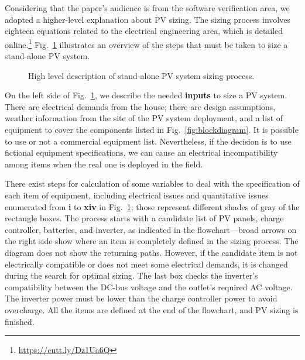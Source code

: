 \documentclass[a4paper,donotrepeattitle,fleqn]{cas-dc}
\begin{document}
Considering that the paper's audience is from the software verification area, we adopted a higher-level explanation about PV sizing. The sizing process involves eighteen equations related to the electrical engineering area, which is detailed online.\footnote{\href{https://cutt.ly/Dz1Ua6Q}{https://cutt.ly/Dz1Ua6Q}} 
Fig.~\ref{fig:flow} illustrates an overview of the steps that must be taken to size a stand-alone PV system.
%
\begin{figure}[ht]
\centering
\caption{High level description of stand-alone PV system sizing process.}
\label{fig:flow} 
\end{figure}
 

On the left side of Fig.~\ref{fig:flow}, we describe the needed \textbf{inputs} to size a PV system. There are electrical demands from the house; there are design assumptions, weather information from the site of the PV system deployment, and a list of equipment to cover the components listed in Fig.~\ref{fig:blockdiagram}. It is possible to use or not a commercial equipment list. Nevertheless, if the decision is to use fictional equipment specifications, we can cause an electrical incompatibility among items when the real one is deployed in the field.
 
There exist steps for calculation of some variables to deal with the specification of each item of equipment, including electrical issues and quantitative issues enumerated from \textbf{i} to \textbf{xiv} in Fig.~\ref{fig:flow}; those represent different shades of gray of the rectangle boxes. The process starts with a candidate list of PV panels, charge controller, batteries, and inverter, as indicated in the flowchart—broad arrows on the right side show where an item is completely defined in the sizing process. The diagram does not show the returning paths. However, if the candidate item is not electrically compatible or does not meet some electrical demands, it is changed during the search for optimal sizing. The last box checks the inverter's compatibility between the DC-bus voltage and the outlet's required AC voltage. The inverter power must be lower than the charge controller power to avoid overcharge. All the items are defined at the end of the flowchart, and PV sizing is finished.
\end{document}
